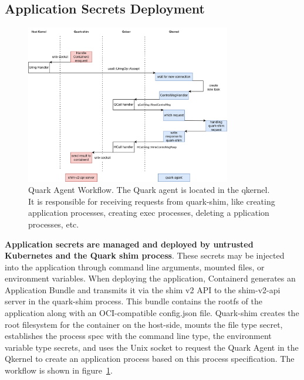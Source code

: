 \subsection{Application Secrets Deployment}
\begin{figure}[H]
    \centering
    \includegraphics[width=0.8\textwidth]{images/quark-agent-work-flow.png}
    \caption[Quark Agent Workflow]{Quark Agent Workflow. The Quark agent is located in the qkernel. It is responsible for receiving requests from quark-shim, like creating application processes, creating exec processes, deleting a
    pplication processes, etc.}
    \label{fig:quark_agent_work_flow}
\end{figure}


\textbf{Application secrets are managed and deployed by untrusted Kubernetes and the Quark shim process}. These secrets may be injected into the application through command line arguments, mounted files, or environment variables. When deploying 
the application, Containerd generates an Application Bundle and transmits it via the shim v2 API\cite*{shim_v2} to the shim-v2-api server in the quark-shim process. This bundle contains the rootfs of the application along with an OCI-compatible config.json file. Quark-shim 
creates the root filesystem for the container on the host-side, mounts the file type secret, establishes the process spec with the command line type, the environment variable type secrets, and uses the Unix socket to request the Quark 
Agent in the Qkernel to create an application process based on this process specification. The workflow is shown in figure~\ref{fig:quark_agent_work_flow}.


